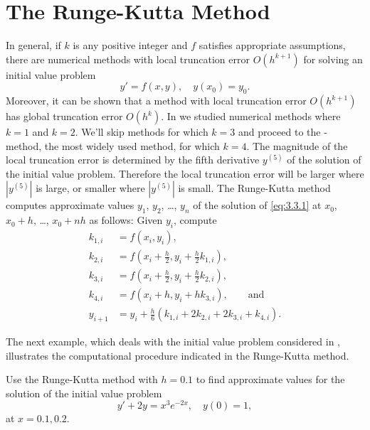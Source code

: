 \section{The Runge-Kutta Method}\label{sec:runge_kutta}

In general, if $k$ is any  positive  integer  and $f$
satisfies appropriate assumptions, there are numerical methods with
local truncation
error
$O(h^{k+1})$ for solving an initial value
problem
\begin{equation} \label{eq:3.3.1}
y'=f(x,y),\quad y(x_0)=y_0.
\end{equation}
Moreover, it can be shown that a method with local truncation error
$O(h^{k+1})$ has global truncation
error
$O(h^k)$. In
 we studied numerical
methods where
$k=1$ and $k=2$. We'll skip methods for which $k=3$ and proceed to the
-
method, the most widely used
method, for which $k=4$. The magnitude of the local truncation error is
determined by the fifth derivative $y^{(5)}$ of the solution of the
initial value problem. Therefore the local truncation error will be
larger where $|y^{(5)}|$ is large, or smaller where $|y^{(5)}|$ is
small.
The Runge-Kutta method computes approximate values
$y_1$, $y_2$, \dots, $y_n$ of the solution of \eqref{eq:3.3.1}
at $x_0$, $x_0+h$, \dots, $x_0+nh$ as follows: Given $y_i$,
compute
\begin{align*}
k_{1,i}&=f(x_i,y_i),\\
k_{2,i}&=f\left(x_i+\frac{h}{2},y_i+\frac{h}{2}k_{1,i}\right),\\
k_{3,i}&=f\left(x_i+\frac{h}{2},y_i+\frac{h}{2}k_{2,i}\right),\\
k_{4,i}&=f(x_i+h,y_i+hk_{3,i}),\qquad\text{and}\\
y_{i+1}&=y_i+\frac{h}{6}(k_{1,i}+2k_{2,i}+2k_{3,i}+k_{4,i}).
\end{align*}

The next example, which deals with the initial value problem
considered in ,
illustrates
the computational procedure indicated in the Runge-Kutta method.

\begin{example}\label{example:3.3.1}
Use the Runge-Kutta method with $h=0.1$ to find approximate values for
the solution of the initial value problem
\begin{equation}\label{eq:3.3.2}
y'+2y=x^3e^{-2x},\quad y(0)=1,
\end{equation}
at $x=0.1,0.2$.
\end{example}

